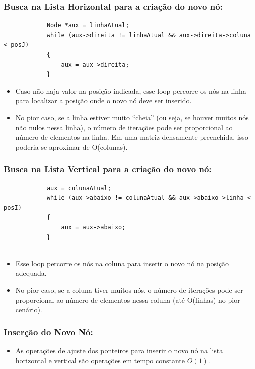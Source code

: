 \documentclass[12pt]{article}
\begin{document}
    \subsubsection{Busca na Lista Horizontal para a criação do novo nó:}
        \begin{lstlisting}
            Node *aux = linhaAtual;
            while (aux->direita != linhaAtual && aux->direita->coluna < posJ)
            {
                aux = aux->direita;
            }
        \end{lstlisting}
        \begin{itemize}
            \item Caso não haja valor na posição indicada, esse loop percorre os nós na linha para localizar a posição onde o novo nó deve ser inserido. 
            
            \item No pior caso, se a linha estiver muito “cheia” (ou seja, se houver muitos nós não nulos nessa linha), o número de iterações pode ser proporcional ao número de elementos na linha. Em uma matriz densamente preenchida, isso poderia se aproximar de O(colunas).
        \end{itemize}

    \subsubsection{Busca na Lista Vertical para a criação do novo nó:}
        \begin{lstlisting}
            aux = colunaAtual;
            while (aux->abaixo != colunaAtual && aux->abaixo->linha < posI)
            {
                aux = aux->abaixo;
            }
    
        \end{lstlisting}
        \begin{itemize}
            \item Esse loop percorre os nós na coluna para inserir o novo nó na posição adequada.
    
            \item No pior caso, se a coluna tiver muitos nós, o número de iterações pode ser proporcional ao número de elementos nessa coluna (até O(linhas) no pior cenário).
        \end{itemize}

    \subsubsection{Inserção do Novo Nó:}
        \begin{itemize}
            \item As operações de ajuste dos ponteiros para inserir o novo nó na lista horizontal e vertical são operações em tempo constante \(O(1)\).
        \end{itemize}
\end{document}
